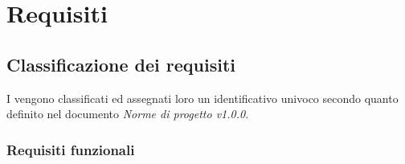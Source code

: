 \documentclass[AnalisiDeiRequisiti.tex]{subfiles}
\begin{document}

\chapter{Requisiti}
\section{Classificazione dei requisiti}
I  vengono classificati ed assegnati loro un identificativo univoco secondo quanto definito nel documento \textit{Norme di progetto v1.0.0}.


\subsection{Requisiti funzionali}
\end{document}
